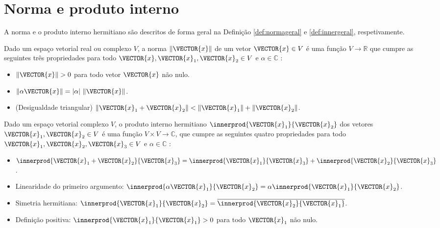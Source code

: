 
\newpage
\section{Norma e produto interno}

A norma e o produto interno hermitiano são descritos de forma geral
na Definição \ref{def:normageral} e \ref{def:innergeral}, respetivamente.

\begin{definition}
\label{def:normageral}
Dado um espaço vetorial real ou complexo $V$,
a norma $\|\VECTOR{x}\|$ de um vetor $\VECTOR{x} \in V$ 
é uma função $V \rightarrow  \mathbb{R}$ 
que cumpre as seguintes três propriedades 
para todo $\VECTOR{x},\VECTOR{x}_1,\VECTOR{x}_2 \in V$ e $\alpha \in \mathbb{C}$ 
\cite[pp. 43]{d2019hermitian} \cite[pp. 27]{vetterli2014foundations}:
\begin{itemize}
\item $\|\VECTOR{x}\|> 0$ para todo vetor $\VECTOR{x}$ não nulo.
\item $\|\alpha \VECTOR{x}\|= |\alpha|~\|\VECTOR{x}\|$.
\item (Desigualdade triangular)  $\|\VECTOR{x}_1 + \VECTOR{x}_2\|< \|\VECTOR{x}_1\| + \|\VECTOR{x}_2\|$.
\end{itemize}
\end{definition}

\begin{definition}
\label{def:innergeral}
Dado um espaço vetorial complexo $V$, 
o produto interno hermitiano $\innerprod{\VECTOR{x}_1}{\VECTOR{x}_2} $ dos vetores $\VECTOR{x}_1,\VECTOR{x}_2 \in V$ 
é uma função $V\times V \rightarrow \mathbb{C}$, 
que cumpre as seguintes quatro propriedades para todo 
$\VECTOR{x}_1,\VECTOR{x}_2,\VECTOR{x}_3 \in V$ e $\alpha \in \mathbb{C}$
 \cite[pp. 44]{d2019hermitian} \cite[pp. 242]{damiano2011course}:
\begin{itemize}
\item $\innerprod{\VECTOR{x}_1+\VECTOR{x}_2}{\VECTOR{x}_3} = \innerprod{\VECTOR{x}_1}{\VECTOR{x}_3} + \innerprod{\VECTOR{x}_2}{\VECTOR{x}_3}$.
\item Linearidade do primeiro argumento: $\innerprod{\alpha \VECTOR{x}_1}{\VECTOR{x}_2} =\alpha \innerprod{\VECTOR{x}_1}{\VECTOR{x}_2}$.
\item Simetria hermitiana: $\innerprod{\VECTOR{x}_1}{\VECTOR{x}_2} =\overline{ \innerprod{\VECTOR{x}_2}{\VECTOR{x}_1}}$.
\item Definição positiva: $\innerprod{\VECTOR{x}_1}{\VECTOR{x}_1} > 0 $  para todo $\VECTOR{x}_1$ não nulo.
\end{itemize}
\end{definition}


